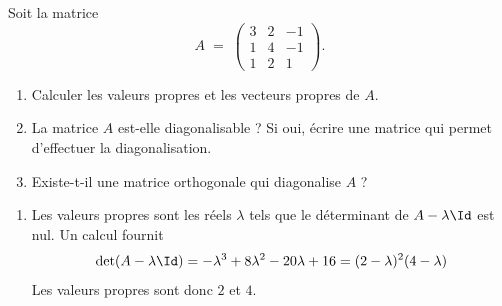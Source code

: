 \documentclass[12pt,french,oneside,a4paper]{memoir} %
\begin{document}
\begin{exo} %
Soit la matrice 
\begin{equation*}
A \;=\; \left( \begin{array}{ccc}
3 &2 &-1 \\
1 &4 &-1 \\
1 &2 &1 \end{array} \right).
\end{equation*}
\begin{enumerate}
\item Calculer les valeurs propres et les vecteurs propres de $A$. 
\item La matrice $A$ est-elle diagonalisable ? Si oui, écrire une 
matrice qui permet d'effectuer la diagonalisation.
\item Existe-t-il une matrice orthogonale qui diagonalise $A$ ?
\end{enumerate}

\begin{correction}
  \begin{enumerate}
  \item Les valeurs propres sont les réels $\lambda$ tels que le déterminant de $A - \lambda \Id$ est nul. Un calcul fournit
  \begin{equation*}
    \det(A-\lambda \Id) = -\lambda^3 + 8\lambda^2 - 20\lambda + 16
    = (2-\lambda)^{2} (4-\lambda)
  \end{equation*}
  Les valeurs propres sont donc $2$ et $4$.


\end{enumerate}
\end{correction}
\end{exo}
\end{document}
